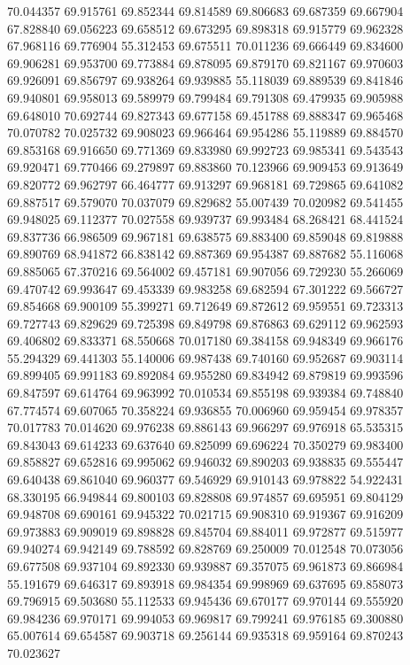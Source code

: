 70.044357
69.915761
69.852344
69.814589
69.806683
69.687359
69.667904
67.828840
69.056223
69.658512
69.673295
69.898318
69.915779
69.962328
67.968116
69.776904
55.312453
69.675511
70.011236
69.666449
69.834600
69.906281
69.953700
69.773884
69.878095
69.879170
69.821167
69.970603
69.926091
69.856797
69.938264
69.939885
55.118039
69.889539
69.841846
69.940801
69.958013
69.589979
69.799484
69.791308
69.479935
69.905988
69.648010
70.692744
69.827343
69.677158
69.451788
69.888347
69.965468
70.070782
70.025732
69.908023
69.966464
69.954286
55.119889
69.884570
69.853168
69.916650
69.771369
69.833980
69.992723
69.985341
69.543543
69.920471
69.770466
69.279897
69.883860
70.123966
69.909453
69.913649
69.820772
69.962797
66.464777
69.913297
69.968181
69.729865
69.641082
69.887517
69.579070
70.037079
69.829682
55.007439
70.020982
69.541455
69.948025
69.112377
70.027558
69.939737
69.993484
68.268421
68.441524
69.837736
66.986509
69.967181
69.638575
69.883400
69.859048
69.819888
69.890769
68.941872
66.838142
69.887369
69.954387
69.887682
55.116068
69.885065
67.370216
69.564002
69.457181
69.907056
69.729230
55.266069
69.470742
69.993647
69.453339
69.983258
69.682594
67.301222
69.566727
69.854668
69.900109
55.399271
69.712649
69.872612
69.959551
69.723313
69.727743
69.829629
69.725398
69.849798
69.876863
69.629112
69.962593
69.406802
69.833371
68.550668
70.017180
69.384158
69.948349
69.966176
55.294329
69.441303
55.140006
69.987438
69.740160
69.952687
69.903114
69.899405
69.991183
69.892084
69.955280
69.834942
69.879819
69.993596
69.847597
69.614764
69.963992
70.010534
69.855198
69.939384
69.748840
67.774574
69.607065
70.358224
69.936855
70.006960
69.959454
69.978357
70.017783
70.014620
69.976238
69.886143
69.966297
69.976918
65.535315
69.843043
69.614233
69.637640
69.825099
69.696224
70.350279
69.983400
69.858827
69.652816
69.995062
69.946032
69.890203
69.938835
69.555447
69.640438
69.861040
69.960377
69.546929
69.910143
69.978822
54.922431
68.330195
66.949844
69.800103
69.828808
69.974857
69.695951
69.804129
69.948708
69.690161
69.945322
70.021715
69.908310
69.919367
69.916209
69.973883
69.909019
69.898828
69.845704
69.884011
69.972877
69.515977
69.940274
69.942149
69.788592
69.828769
69.250009
70.012548
70.073056
69.677508
69.937104
69.892330
69.939887
69.357075
69.961873
69.866984
55.191679
69.646317
69.893918
69.984354
69.998969
69.637695
69.858073
69.796915
69.503680
55.112533
69.945436
69.670177
69.970144
69.555920
69.984236
69.970171
69.994053
69.969817
69.799241
69.976185
69.300880
65.007614
69.654587
69.903718
69.256144
69.935318
69.959164
69.870243
70.023627
